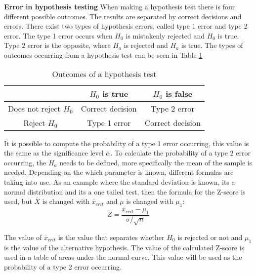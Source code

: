 \noindent \textbf{Error in hypothesis testing}
\newline
When making a hypothesis test there is four different possible outcomes. The results are separated by correct decisions and errors. There exist two types of hypothesis errors, called type 1 error and type 2 error. The type 1 error occurs when $H_0$ is mistakenly rejected and $H_0$ is true. Type 2 error is the opposite, where $H_a$ is rejected and $H_a$ is true. The types of outcomes occurring from a hypothesis test can be seen in Table \ref{tab:example2x3}
\begin{table}[h!]
	\centering
	\begin{tabular}{|c|c|c|}
		\hline
		 & $H_0$ is true & $H_0$ is false \\
		\hline
		Does not reject $H_0$ & Correct decision & Type 2 error \\ \hline
		Reject $H_0$ & Type 1 error & Correct decision \\
		\hline
	\end{tabular}
	\caption{Outcomes of a hypothesis test}
	\label{tab:example2x3}
\end{table}

It is possible to compute the probability of a type 1 error occurring, this value is the same as the significance level $\alpha$. To calculate the probability of a type 2 error occurring, the $H_a$ needs to be defined, more specifically the mean of the sample is needed. Depending on the which parameter is known, different formulas are taking into use. As an example where the standard deviation is known, its a normal distribution and its a one tailed test, then the formula for the Z-score is used, but $\overline{X}$ is changed with $\overline{x}_{crit}$ and $\mu$ is changed with $\mu_1$:
$$
Z=\frac{\overline{x}_{crit}-\mu_1}{\sigma/\sqrt{n}}
$$

The value of $\overline{x}_{crit}$ is the value that separates whether $H_0$ is rejected or not and $\mu_1$ is the value of the alternative hypothesis.
The value of the calculated Z-score is used in a table of areas under the normal curve. This value will be used as the probability of a type 2 error occurring.


